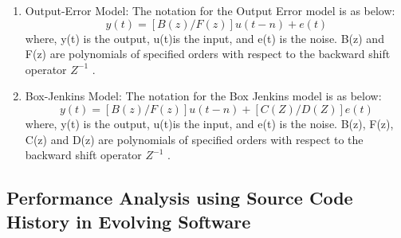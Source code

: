 \documentclass[article,type=msc,colorback,12pt,accentcolor=tud7b,table]{tudthesis}
\begin{document}
\begin{enumerate}
	\item{Output-Error Model:} 
		The notation for the Output Error model is as below: $$ y(t) = [B(z)/F(z)] u(t-n) + e(t) $$ where, y(t) is the output, u(t)is the input, and e(t) is the noise. B(z) and F(z) are polynomials of specified orders with respect to the backward shift operator $Z^{-1}$ \cite{oe}.
	
	\item{Box-Jenkins Model:} 	
		 The notation for the Box Jenkins model is as below: $$ y(t) = [B(z)/F(z)] u(t-n) + [C(Z)/D(Z)] e(t) $$ where, y(t) is the output, u(t)is the input, and e(t) is the noise. B(z), F(z), C(z) and D(z) are polynomials of specified orders with respect to the backward shift operator $Z^{-1}$ \cite{bj}.
		 
	\end{enumerate}
	
	\subsection{Performance Analysis using Source Code History in Evolving Software}
	
\end{document}
